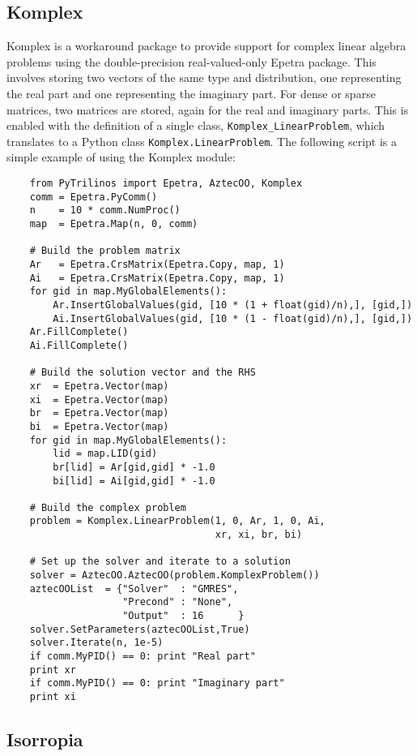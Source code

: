 \documentclass[11pt]{article}
\begin{document}
\subsection{Komplex}
\label{sec:komplex}

Komplex is a workaround package to provide support for complex linear algebra problems using the double-precision real-valued-only Epetra package.  This involves storing two vectors of the same type and distribution, one representing the real part and one representing the imaginary part.  For dense or sparse matrices, two matrices are stored, again for the real and imaginary parts.  This is enabled with the definition of a single class, {\tt Komplex\_LinearProblem}, which translates to a Python class {\tt Komplex.LinearProblem}.  The following script is a simple example of using the Komplex module:

\begin{verbatim}
    from PyTrilinos import Epetra, AztecOO, Komplex
    comm = Epetra.PyComm()
    n    = 10 * comm.NumProc()
    map  = Epetra.Map(n, 0, comm)
    
    # Build the problem matrix
    Ar   = Epetra.CrsMatrix(Epetra.Copy, map, 1)
    Ai   = Epetra.CrsMatrix(Epetra.Copy, map, 1)
    for gid in map.MyGlobalElements():
        Ar.InsertGlobalValues(gid, [10 * (1 + float(gid)/n),], [gid,])
        Ai.InsertGlobalValues(gid, [10 * (1 - float(gid)/n),], [gid,])
    Ar.FillComplete()
    Ai.FillComplete()

    # Build the solution vector and the RHS
    xr  = Epetra.Vector(map)
    xi  = Epetra.Vector(map)
    br  = Epetra.Vector(map)
    bi  = Epetra.Vector(map)
    for gid in map.MyGlobalElements():
        lid = map.LID(gid)
        br[lid] = Ar[gid,gid] * -1.0
        bi[lid] = Ai[gid,gid] * -1.0

    # Build the complex problem
    problem = Komplex.LinearProblem(1, 0, Ar, 1, 0, Ai,
                                    xr, xi, br, bi)

    # Set up the solver and iterate to a solution
    solver = AztecOO.AztecOO(problem.KomplexProblem())
    aztecOOList  = {"Solver"  : "GMRES",
                    "Precond" : "None",
                    "Output"  : 16      }
    solver.SetParameters(aztecOOList,True)
    solver.Iterate(n, 1e-5)
    if comm.MyPID() == 0: print "Real part"
    print xr
    if comm.MyPID() == 0: print "Imaginary part"
    print xi
\end{verbatim}

\subsection{Isorropia}
\label{sec:isorropia}
\end{document}
